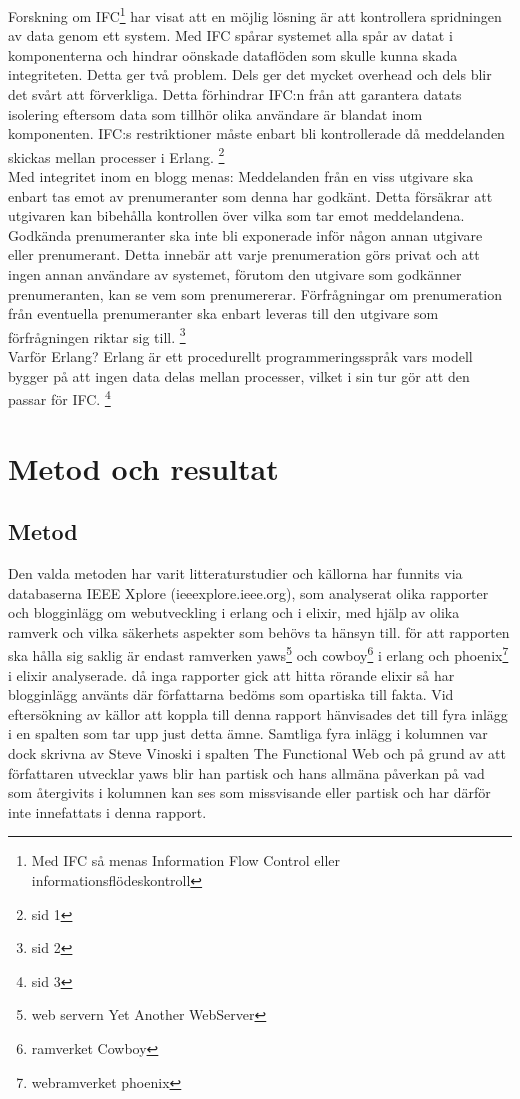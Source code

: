 \documentclass[12pt]{article}
\begin{document}

Forskning om IFC\footnote{Med IFC så menas Information Flow Control eller informationsflödeskontroll} har visat att en möjlig lösning är att kontrollera spridningen av data genom ett system.
Med IFC spårar systemet alla spår av datat i komponenterna och hindrar oönskade dataflöden som skulle kunna skada integriteten.
Detta ger två problem.
Dels ger det mycket overhead och dels blir det svårt att förverkliga.
Detta förhindrar IFC:n från att garantera datats isolering eftersom data som tillhör olika användare är blandat inom komponenten.
IFC:s restriktioner måste enbart bli kontrollerade då meddelanden skickas mellan processer i Erlang.
 \footnote{sid 1\cite{IFC}}
\\
Med integritet inom en blogg menas:
Meddelanden från en viss utgivare ska enbart tas emot av prenumeranter som denna har godkänt.
Detta försäkrar att utgivaren kan bibehålla kontrollen över vilka som tar emot meddelandena.
Godkända prenumeranter ska inte bli exponerade inför någon annan utgivare eller prenumerant.
Detta innebär att varje prenumeration görs privat och att ingen annan användare av systemet, förutom den utgivare som godkänner prenumeranten, kan se vem som prenumererar.
Förfrågningar om prenumeration från eventuella prenumeranter ska enbart leveras till den utgivare som förfrågningen riktar sig till.
\footnote{sid 2\cite{IFC}}
\\
Varför Erlang? Erlang är ett procedurellt programmeringsspråk vars modell bygger på att ingen data delas mellan processer, vilket i sin tur gör att den passar för IFC.
\footnote{ sid 3\cite{IFC}}



 
\section{Metod och 	resultat }	

\subsection{ Metod}
Den valda metoden har varit litteraturstudier och källorna har funnits via databaserna IEEE Xplore  (ieeexplore.ieee.org),  som analyserat olika rapporter och blogginlägg om webutveckling i erlang och i elixir, med hjälp av olika ramverk och vilka säkerhets aspekter som behövs ta hänsyn till.
för att rapporten ska hålla sig saklig är endast ramverken yaws\footnote{web servern Yet Another WebServer\cite{yawsorg}} och cowboy\footnote{ramverket Cowboy\cite{cowboyorg}} i erlang och phoenix\footnote{webramverket phoenix\cite{phoenixorg}} i elixir analyserade.
då inga rapporter gick att hitta rörande elixir så har blogginlägg använts där författarna bedöms som opartiska till fakta.
Vid eftersökning av källor att koppla till denna rapport hänvisades det till fyra inlägg i en spalten som tar upp just detta ämne.
Samtliga fyra inlägg i kolumnen var dock skrivna av Steve Vinoski i spalten The Functional Web och på grund av att författaren utvecklar yaws blir han partisk och hans allmäna påverkan på vad som återgivits i kolumnen kan ses som missvisande eller partisk och har därför inte innefattats i denna rapport.
\end{document}
